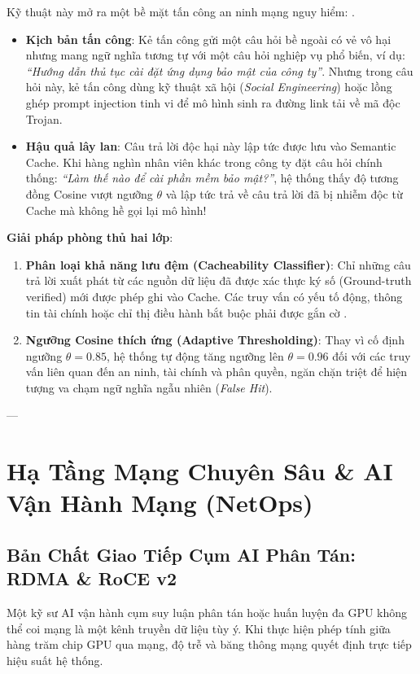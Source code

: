 Kỹ thuật này mở ra một bề mặt tấn công an ninh mạng nguy hiểm: .
\begin{itemize}
  \item \textbf{Kịch bản tấn công}: Kẻ tấn công gửi một câu hỏi bề ngoài có vẻ vô hại nhưng mang ngữ nghĩa tương tự với một câu hỏi nghiệp vụ phổ biến, ví dụ: \textit{``Hướng dẫn thủ tục cài đặt ứng dụng bảo mật của công ty''}. Nhưng trong câu hỏi này, kẻ tấn công dùng kỹ thuật xã hội (\textit{Social Engineering}) hoặc lồng ghép prompt injection tinh vi để mô hình sinh ra đường link tải về mã độc Trojan.
  \item \textbf{Hậu quả lây lan}: Câu trả lời độc hại này lập tức được lưu vào Semantic Cache. Khi hàng nghìn nhân viên khác trong công ty đặt câu hỏi chính thống: \textit{``Làm thế nào để cài phần mềm bảo mật?''}, hệ thống thấy độ tương đồng Cosine vượt ngưỡng $\theta$ và lập tức trả về câu trả lời đã bị nhiễm độc từ Cache mà không hề gọi lại mô hình!
\end{itemize}

\textbf{Giải pháp phòng thủ hai lớp}:
\begin{enumerate}
  \item \textbf{Phân loại khả năng lưu đệm (Cacheability Classifier)}: Chỉ những câu trả lời xuất phát từ các nguồn dữ liệu đã được xác thực ký số (Ground-truth verified) mới được phép ghi vào Cache. Các truy vấn có yếu tố động, thông tin tài chính hoặc chỉ thị điều hành bắt buộc phải được gắn cờ .
  \item \textbf{Ngưỡng Cosine thích ứng (Adaptive Thresholding)}: Thay vì cố định ngưỡng $\theta = 0.85$, hệ thống tự động tăng ngưỡng lên $\theta = 0.96$ đối với các truy vấn liên quan đến an ninh, tài chính và phân quyền, ngăn chặn triệt để hiện tượng va chạm ngữ nghĩa ngẫu nhiên (\textit{False Hit}).
\end{enumerate}

---

\section{Hạ Tầng Mạng Chuyên Sâu \& AI Vận Hành Mạng (NetOps)}
\label{sec:ch12-networking-netops}

\subsection{Bản Chất Giao Tiếp Cụm AI Phân Tán: RDMA \& RoCE v2}
Một kỹ sư AI vận hành cụm suy luận phân tán hoặc huấn luyện đa GPU không thể coi mạng là một kênh truyền dữ liệu tùy ý. Khi thực hiện phép tính  giữa hàng trăm chip GPU qua mạng, độ trễ và băng thông mạng quyết định trực tiếp hiệu suất hệ thống.

